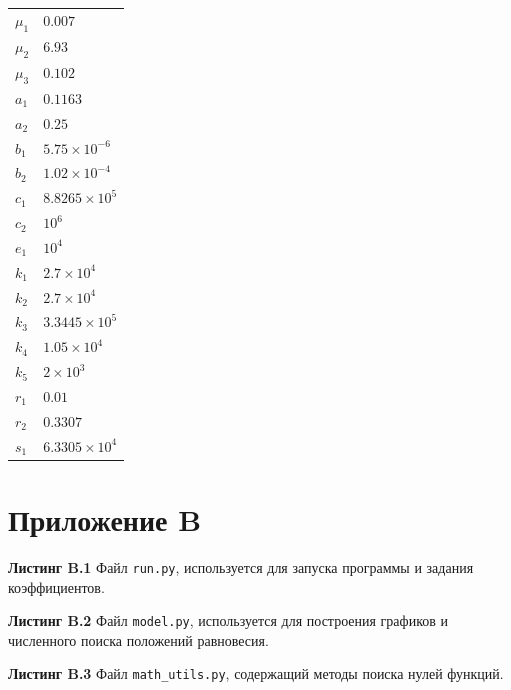\documentclass[14pt,a4paper]{extarticle}
\begin{document}
\begin{center}
\begin{tabu}{ |X[c]|X[c]| }
			$\mu_1$ & $0.007$\\ 
			$\mu_2$ & $6.93$\\ 
			$\mu_3$ & $0.102$\\
			$a_1$ & $0.1163$\\
			$a_2$ & $0.25$\\
			$b_1$ & $5.75\times10^{-6}$\\
			$b_2$ & $1.02\times10^{-4}$\\
			$c_1$ & $8.8265\times10^5$\\
			$c_2$ & $10^6$\\
			$e_1$ & $10^4$\\
			$k_1$ & $2.7\times10^4$\\
			$k_2$ & $2.7\times10^4$\\
			$k_3$ & $3.3445\times10^5$\\
			$k_4$ & $1.05\times10^4$\\
			$k_5$ & $2\times10^3$\\
			$r_1$ & $0.01$\\
			$r_2$ & $0.3307$\\
			$s_1$ & $6.3305\times10^4$\\
			\hline
		\end{tabu}
	\end{center}
	
	\section*{Приложение B}
	\begin{center}
		\textbf{Листинг B.1} Файл \texttt{run.py}, используется для запуска программы и задания коэффициентов.
	\end{center}
	
	\newpage
	\begin{center}
		\textbf{Листинг B.2} Файл \texttt{model.py}, используется для построения графиков и численного поиска положений равновесия.
	\end{center}
	
	\newpage
	\begin{center}
		\textbf{Листинг B.3} Файл \texttt{math\_utils.py}, содержащий методы поиска нулей функций.
	\end{center}
	
\end{document}
